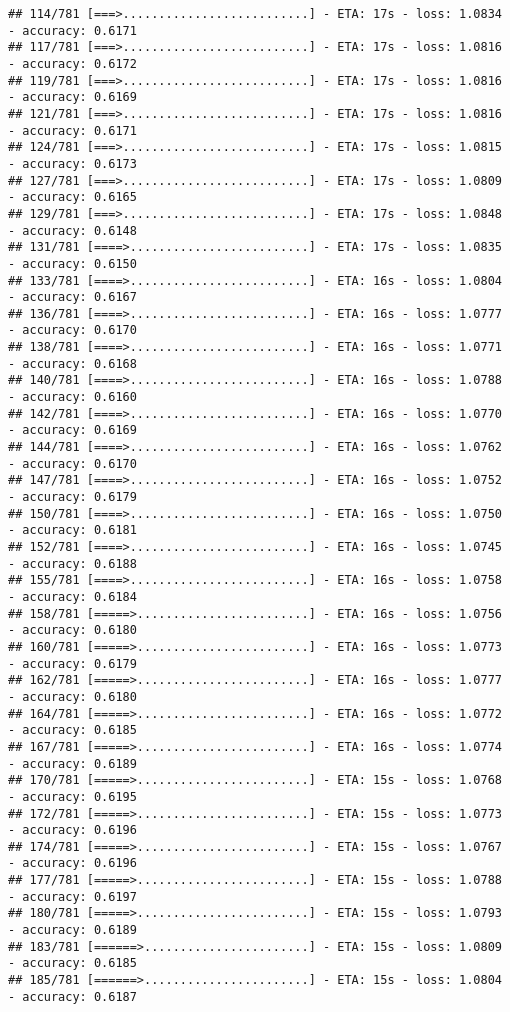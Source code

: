 \documentclass[
]{article}
\begin{document}
\begin{verbatim}
## 114/781 [===>..........................] - ETA: 17s - loss: 1.0834 - accuracy: 0.6171
## 117/781 [===>..........................] - ETA: 17s - loss: 1.0816 - accuracy: 0.6172
## 119/781 [===>..........................] - ETA: 17s - loss: 1.0816 - accuracy: 0.6169
## 121/781 [===>..........................] - ETA: 17s - loss: 1.0816 - accuracy: 0.6171
## 124/781 [===>..........................] - ETA: 17s - loss: 1.0815 - accuracy: 0.6173
## 127/781 [===>..........................] - ETA: 17s - loss: 1.0809 - accuracy: 0.6165
## 129/781 [===>..........................] - ETA: 17s - loss: 1.0848 - accuracy: 0.6148
## 131/781 [====>.........................] - ETA: 17s - loss: 1.0835 - accuracy: 0.6150
## 133/781 [====>.........................] - ETA: 16s - loss: 1.0804 - accuracy: 0.6167
## 136/781 [====>.........................] - ETA: 16s - loss: 1.0777 - accuracy: 0.6170
## 138/781 [====>.........................] - ETA: 16s - loss: 1.0771 - accuracy: 0.6168
## 140/781 [====>.........................] - ETA: 16s - loss: 1.0788 - accuracy: 0.6160
## 142/781 [====>.........................] - ETA: 16s - loss: 1.0770 - accuracy: 0.6169
## 144/781 [====>.........................] - ETA: 16s - loss: 1.0762 - accuracy: 0.6170
## 147/781 [====>.........................] - ETA: 16s - loss: 1.0752 - accuracy: 0.6179
## 150/781 [====>.........................] - ETA: 16s - loss: 1.0750 - accuracy: 0.6181
## 152/781 [====>.........................] - ETA: 16s - loss: 1.0745 - accuracy: 0.6188
## 155/781 [====>.........................] - ETA: 16s - loss: 1.0758 - accuracy: 0.6184
## 158/781 [=====>........................] - ETA: 16s - loss: 1.0756 - accuracy: 0.6180
## 160/781 [=====>........................] - ETA: 16s - loss: 1.0773 - accuracy: 0.6179
## 162/781 [=====>........................] - ETA: 16s - loss: 1.0777 - accuracy: 0.6180
## 164/781 [=====>........................] - ETA: 16s - loss: 1.0772 - accuracy: 0.6185
## 167/781 [=====>........................] - ETA: 16s - loss: 1.0774 - accuracy: 0.6189
## 170/781 [=====>........................] - ETA: 15s - loss: 1.0768 - accuracy: 0.6195
## 172/781 [=====>........................] - ETA: 15s - loss: 1.0773 - accuracy: 0.6196
## 174/781 [=====>........................] - ETA: 15s - loss: 1.0767 - accuracy: 0.6196
## 177/781 [=====>........................] - ETA: 15s - loss: 1.0788 - accuracy: 0.6197
## 180/781 [=====>........................] - ETA: 15s - loss: 1.0793 - accuracy: 0.6189
## 183/781 [======>.......................] - ETA: 15s - loss: 1.0809 - accuracy: 0.6185
## 185/781 [======>.......................] - ETA: 15s - loss: 1.0804 - accuracy: 0.6187

\end{verbatim}
\end{document}
